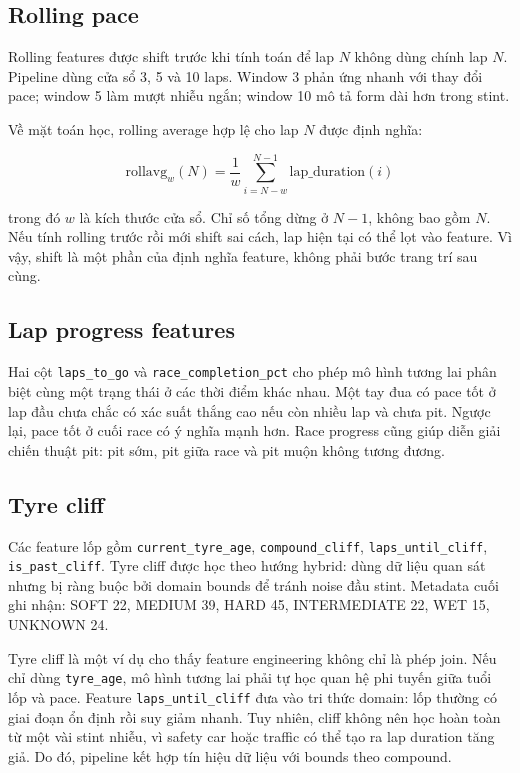 \documentclass[conference]{IEEEtran}
\begin{document}
\subsection{Rolling pace}
Rolling features được shift trước khi tính toán để lap \(N\) không dùng chính lap \(N\). Pipeline dùng cửa sổ 3, 5 và 10 laps. Window 3 phản ứng nhanh với thay đổi pace; window 5 làm mượt nhiễu ngắn; window 10 mô tả form dài hơn trong stint.

Về mặt toán học, rolling average hợp lệ cho lap \(N\) được định nghĩa:

\begin{equation}
\text{rollavg}_{w}(N) = \frac{1}{w}\sum_{i=N-w}^{N-1} \text{lap\_duration}(i)
\end{equation}

trong đó \(w\) là kích thước cửa sổ. Chỉ số tổng dừng ở \(N-1\), không bao gồm \(N\). Nếu tính rolling trước rồi mới shift sai cách, lap hiện tại có thể lọt vào feature. Vì vậy, shift là một phần của định nghĩa feature, không phải bước trang trí sau cùng.

\subsection{Lap progress features}
Hai cột \texttt{laps\_to\_go} và \texttt{race\_completion\_pct} cho phép mô hình tương lai phân biệt cùng một trạng thái ở các thời điểm khác nhau. Một tay đua có pace tốt ở lap đầu chưa chắc có xác suất thắng cao nếu còn nhiều lap và chưa pit. Ngược lại, pace tốt ở cuối race có ý nghĩa mạnh hơn. Race progress cũng giúp diễn giải chiến thuật pit: pit sớm, pit giữa race và pit muộn không tương đương.

\subsection{Tyre cliff}
Các feature lốp gồm \texttt{current\_tyre\_age}, \texttt{compound\_cliff}, \texttt{laps\_until\_cliff}, \texttt{is\_past\_cliff}. Tyre cliff được học theo hướng hybrid: dùng dữ liệu quan sát nhưng bị ràng buộc bởi domain bounds để tránh noise đầu stint. Metadata cuối ghi nhận: SOFT 22, MEDIUM 39, HARD 45, INTERMEDIATE 22, WET 15, UNKNOWN 24.

Tyre cliff là một ví dụ cho thấy feature engineering không chỉ là phép join. Nếu chỉ dùng \texttt{tyre\_age}, mô hình tương lai phải tự học quan hệ phi tuyến giữa tuổi lốp và pace. Feature \texttt{laps\_until\_cliff} đưa vào tri thức domain: lốp thường có giai đoạn ổn định rồi suy giảm nhanh. Tuy nhiên, cliff không nên học hoàn toàn từ một vài stint nhiễu, vì safety car hoặc traffic có thể tạo ra lap duration tăng giả. Do đó, pipeline kết hợp tín hiệu dữ liệu với bounds theo compound.
\end{document}

